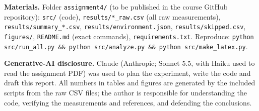\documentclass[10pt,a4paper]{article}
\begin{document}
\textbf{Materials.} Folder \texttt{assignment4/} (to be published in the course GitHub repository): \texttt{src/} (code), \texttt{results/*\_raw.csv} (all raw measurements), \texttt{results/summary\_*.csv}, \texttt{results/environment.json}, \texttt{results/skipped.csv}, \texttt{figures/}, \texttt{README.md} (exact commands), \texttt{requirements.txt}. Reproduce: \texttt{python src/run\_all.py \&\& python src/analyze.py \&\& python src/make\_latex.py}.

\textbf{Generative-AI disclosure.} Claude (Anthropic; Sonnet 5.5, with Haiku used to read the assignment PDF) was used to plan the experiment, write the code and draft this report. All numbers in tables and figures are generated by the included scripts from the raw CSV files; the author is responsible for understanding the code, verifying the measurements and references, and defending the conclusions.
\end{document}
